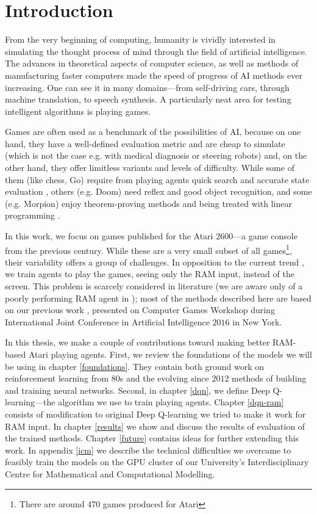 \chapter*{Introduction}
From the very beginning of computing, humanity is vividly interested in simulating the thought process of mind through the field of artificial intelligence. The advances in theoretical aspects of computer science, as well as methods of manufacturing faster computers made the speed of progress of AI methods ever increasing. One can see it in many domains---from self-driving cars, through machine translation, to speech synthesis. A particularly neat area for testing intelligent algorithms is playing games.

Games are often used as a benchmark of the possibilities of AI, because on one hand, they have a well-defined evaluation metric and are cheap to simulate (which is not the case e.g. with medical diagnosis or steering robots) and, on the other hand, they offer limitless variants and levels of difficulty. While some of them (like chess, Go) require from playing agents quick search and accurate state evaluation \cite{alphago}, others (e.g. Doom) need reflex and good object recognition, and some (e.g. Morpion) enjoy theorem-proving methods and being treated with linear programming \cite{morpion}.

In this work, we focus on games published for the Atari 2600---a game console from the previous century. While these are a very small subset of all games\footnote{There are around 470 games produced for Atari}, their variability offers a group of challenges. In opposition to the current trend \cite{nips-dqn, nature-dqn, a3c}, we train agents to play the games, seeing only the RAM input, instead of the screen. This problem is scarcely considered in literature (we are aware only of a poorly performing RAM agent in \cite{ale}); most of the methods described here are based on our previous work \cite{our-paper}, presented on Computer Games Workshop during International Joint Conference in Artificial Intelligence $2016$ in New York.

In this thesis, we make a couple of contributions toward making better RAM-based Atari playing agents. First, we review the foundations of the models we will be using in chapter \ref{foundations}. They contain both ground work on reinforcement learning from 80s and the evolving since $2012$ methods of building and training neural networks.
Second, in chapter \ref{dqn}, we define Deep Q-learning---the algorithm we use to train playing agents.
Chapter \ref{dqn-ram} consists of modification to original Deep Q-learning we tried to make it work for RAM input.
In chapter \ref{results} we show and discuss the results of evaluation of the trained methods.
Chapter \ref{future} contains ideas for further extending this work.
In appendix \ref{icm} we describe the technical difficulties we overcame to feasibly train the models on the GPU cluster of our University's Interdisciplinary Centre for Mathematical and Computational Modelling.
\iffalse
\section*{Acknowledgements}
\addcontentsline{toc}{section}{Acknowledgements}
First of all, I would like to thank dr hab. Henryk Michalewski 
\todo{Acknowledgements to Marc, Henryk, ICM \& Deepsense.io}
\fi
